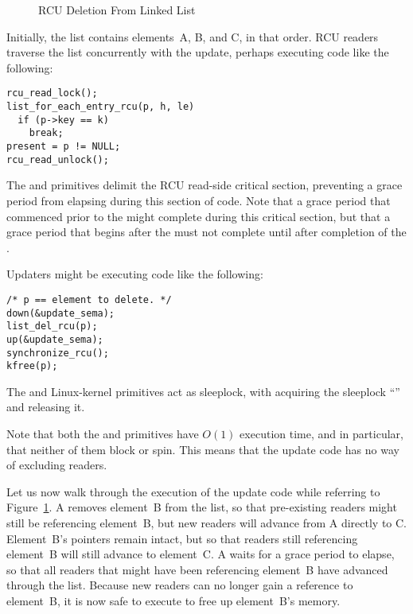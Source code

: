 \begin{figure}[htb]
\centering
{}
\caption{RCU Deletion From Linked List}
\label{fig:advsync:RCU Deletion From Linked List}
\end{figure}

Initially, the list contains elements~A, B, and C, in that order.
RCU readers traverse the list concurrently with the update,
perhaps executing code like the following:

\vspace{5pt}
\begin{minipage}[t]{\columnwidth}
\begin{verbatim}
rcu_read_lock();
list_for_each_entry_rcu(p, h, le)
  if (p->key == k)
  	break;
present = p != NULL;
rcu_read_unlock();
\end{verbatim}
\end{minipage}
\vspace{5pt}

The  and  primitives
delimit the RCU read-side critical section, preventing a grace
period from elapsing during this section of code.
Note that a grace period that commenced prior to the 
might complete during this critical section, but that a grace period
that begins after the  must not complete until
after completion of the .

Updaters might be executing code like the following:

\vspace{5pt}
\begin{minipage}[t]{\columnwidth}
\begin{verbatim}
/* p == element to delete. */
down(&update_sema);
list_del_rcu(p);
up(&update_sema);
synchronize_rcu();
kfree(p);
\end{verbatim}
\end{minipage}
\vspace{5pt}

The  and  Linux-kernel primitives act as sleeplock,
with  acquiring the sleeplock ``''
and  releasing it.

Note that both the  and 
primitives have $O\left(1\right)$ execution time, and in particular, that
neither of them block or spin.
This means that the update code has no way of excluding readers.

Let us now walk through the execution of the update code
while referring to
Figure~\ref{fig:advsync:RCU Deletion From Linked List}.
A  removes element~B from the list, so that
pre-existing readers might still be referencing
element~B, but new readers will advance from A directly to C.
Element~B's pointers remain intact, but so that readers still
referencing element~B will still advance to element~C.
A  waits for a grace period to elapse,
so that all readers that might have been referencing element~B have
advanced through the list.
Because new readers can no longer gain a reference to element~B,
it is now safe to execute  to free up element~B's memory.

